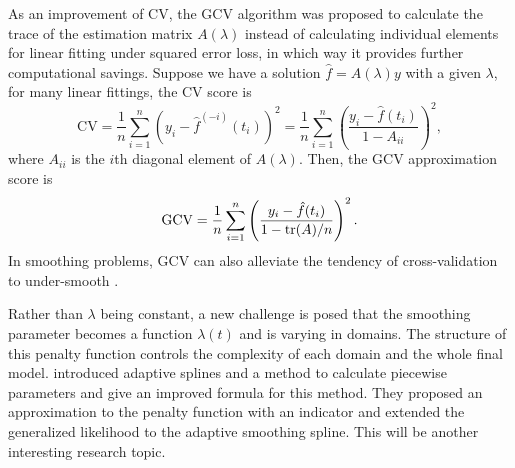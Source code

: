 As an improvement of CV, the GCV algorithm was proposed to calculate the trace of the estimation matrix $A(\lambda)$ instead of calculating individual elements for linear fitting under squared error loss, in which way it provides further computational savings. Suppose we have a solution $\hat{f}=A(\lambda)y$ with a given $\lambda$, for many linear fittings, the CV score is 
\begin{equation*}
\mbox{CV} = \frac{1}{n}\sum_{i=1}^{n} \left( y_i - \hat{f}^{(-i)}(t_i)\right)^2 = \frac{1}{n} \sum_{i=1}^{n}\left( \frac{y_i-\hat{f}(t_i)}{1-A_{ii}}  \right)^2, 
\end{equation*}
where $A_{ii}$ is the $i$th diagonal element of $A(\lambda)$. Then, the GCV approximation score is 
\begin{equation*}
\mbox{GCV} =\frac{1}{n} \sum_{i=1}^{n}\left( \frac{y_i-\hat{f}(t_i)}{1-\mathrm{tr}(A)/n}  \right)^2.
\end{equation*}
In smoothing problems, GCV can also alleviate the tendency of cross-validation to under-smooth \cite{esl2009}. 


%


Rather than $\lambda$ being constant, a new challenge is posed that the smoothing parameter becomes a function $\lambda(t)$ and is varying in domains. The structure of this penalty function controls the complexity of each domain and the whole final model.  \cite{donoho1995wavelet} introduced adaptive splines and a method to calculate piecewise parameters and \cite{liu2010data} give an improved formula for this method. They proposed an approximation to the penalty function with an indicator and extended the generalized likelihood to the adaptive smoothing spline. This will be another interesting research topic. 



